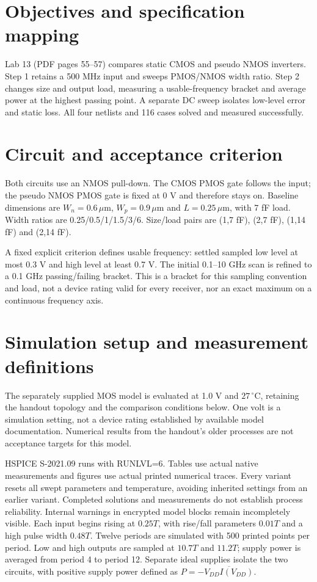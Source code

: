\section{Objectives and specification mapping}
Lab 13 (PDF pages 55--57) compares static CMOS and pseudo NMOS inverters. Step 1 retains a 500 MHz input and sweeps PMOS/NMOS width ratio. Step 2 changes size and output load, measuring a usable-frequency bracket and average power at the highest passing point. A separate DC sweep isolates low-level error and static loss. All four netlists and 116 cases solved and measured successfully.

\section{Circuit and acceptance criterion}
Both circuits use an NMOS pull-down. The CMOS PMOS gate follows the input; the pseudo NMOS PMOS gate is fixed at 0 V and therefore stays on. Baseline dimensions are $W_n=0.6\,\mu$m, $W_p=0.9\,\mu$m and $L=0.25\,\mu$m, with 7 fF load. Width ratios are 0.25/0.5/1/1.5/3/6. Size/load pairs are (1,7 fF), (2,7 fF), (1,14 fF) and (2,14 fF).

A fixed explicit criterion defines usable frequency: settled sampled low level at most 0.3 V and high level at least 0.7 V. The initial 0.1--10 GHz scan is refined to a 0.1 GHz passing/failing bracket. This is a bracket for this sampling convention and load, not a device rating valid for every receiver, nor an exact maximum on a continuous frequency axis.

\section{Simulation setup and measurement definitions}
The separately supplied MOS model is evaluated at 1.0 V and $27\,^{\circ}$C, retaining the handout topology and the comparison conditions below. One volt is a simulation setting, not a device rating established by available model documentation. Numerical results from the handout's older processes are not acceptance targets for this model.

HSPICE S-2021.09 runs with RUNLVL=6. Tables use actual native measurements and figures use actual printed numerical traces. Every variant resets all swept parameters and temperature, avoiding inherited settings from an earlier variant. Completed solutions and measurements do not establish process reliability. Internal warnings in encrypted model blocks remain incompletely visible.
Each input begins rising at $0.25T$, with rise/fall parameters $0.01T$ and a high pulse width $0.48T$. Twelve periods are simulated with 500 printed points per period. Low and high outputs are sampled at $10.7T$ and $11.2T$; supply power is averaged from period 4 to period 12. Separate ideal supplies isolate the two circuits, with positive supply power defined as $P=-\overline{V_{DD}I(V_{DD})}$.

